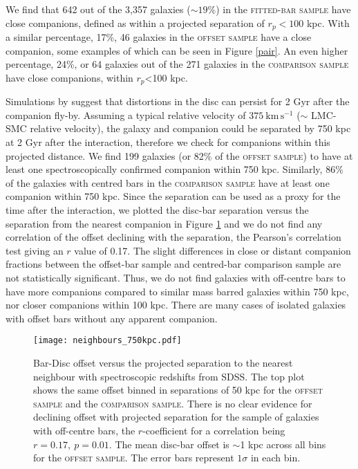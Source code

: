 \documentclass[a4paper,fleqn,usenatbib,useAMS]{mnras}
\begin{document}
We find that 642 out of the 3,357 galaxies ($\sim$$19\%$) in the \textsc{fitted-bar sample} have close companions, defined as within a projected separation of $r_{p}<100$ kpc. With a similar percentage, 17\%, 46 galaxies in the \textsc{offset sample} have a close companion, some examples of which can be seen in Figure \ref{pair}. An even higher percentage, 24\%, or 64 galaxies out of the 271 galaxies in the \textsc{comparison sample} have close companions, within $r_{p}$<100 kpc.

Simulations by \citet{Pardy2016} suggest that distortions in the disc can persist for 2 Gyr after the companion fly-by. Assuming a typical relative velocity of $375\:\mathrm{km\,s^{-1}}$ ($\sim$ LMC-SMC relative velocity), the galaxy and companion could be separated by 750 kpc at 2 Gyr after the interaction, therefore we check for companions within this projected distance. We find 199 galaxies (or 82\% of the \textsc{offset sample}) to have at least one spectroscopically confirmed companion within 750 kpc. Similarly, 86\% of the galaxies with centred bars in the \textsc{comparison sample} have at least one companion within 750 kpc.  Since the separation can be used as a proxy for the time after the interaction, we plotted the disc-bar separation versus the separation from the nearest companion in Figure \ref{neighbour} and we do not find any correlation of the offset declining with the separation, the Pearson's correlation test giving an $r$ value of 0.17.  The slight differences in close or distant companion fractions between the offset-bar sample and centred-bar comparison sample are not statistically significant. Thus, we do not find galaxies with off-centre bars to have more companions compared to similar mass barred galaxies within 750 kpc, nor closer companions within 100 kpc. There are many cases of isolated galaxies with offset bars without any apparent companion. 

\begin{figure}
 \texttt{[image: neighbours\_750kpc.pdf]}
 \caption{Bar-Disc offset versus the projected separation to the nearest neighbour with spectroscopic redshifts from SDSS. The top plot shows the same offset binned in separations of 50 kpc for the \textsc{offset sample} and the \textsc{comparison sample}. There is no clear evidence for declining offset with projected separation for the sample of galaxies with off-centre bars, the $r$-coefficient for a correlation being $r=0.17,\:p=0.01$. The mean disc-bar offset is $\sim$1 kpc across all bins for the \textsc{offset sample}. The error bars represent $1\sigma$ in each bin.}
 \label{neighbour}
\end{figure}
\end{document}

